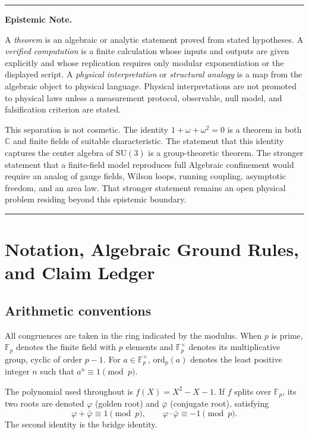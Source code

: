 \documentclass[12pt,oneside]{article}
\theoremstyle{principia}
\theoremstyle{definition}
\theoremstyle{remark}
\providecommand{\CC}{\mathbb{C}}
\providecommand{\FF}{\mathbb{F}}
\providecommand{\vp}{\varphi}
\providecommand{\vpbar}{\bar{\varphi}}
\begin{document}
\newpage

\newpage

\vspace{0.5em}
\noindent\rule{\linewidth}{0.4pt}
{\small\noindent\textbf{Epistemic Note.}

A \emph{theorem} is an algebraic or analytic statement proved from stated hypotheses. A \emph{verified computation} is a finite calculation whose inputs and outputs are given explicitly and whose replication requires only modular exponentiation or the displayed script. A \emph{physical interpretation} or \emph{structural analogy} is a map from the algebraic object to physical language. Physical interpretations are not promoted to physical laws unless a measurement protocol, observable, null model, and falsification criterion are stated.

This separation is not cosmetic. The identity $1 + \omega + \omega^2 = 0$ is a theorem in both $\CC$ and finite fields of suitable characteristic. The statement that this identity captures the center algebra of $\mathrm{SU}(3)$ is a group-theoretic theorem. The stronger statement that a finite-field model reproduces full Algebraic confinement would require an analog of gauge fields, Wilson loops, running coupling, asymptotic freedom, and an area law. That stronger statement remains an open physical problem residing beyond this epistemic boundary.}
\noindent\rule{\linewidth}{0.4pt}
\vspace{0.5em}

\section{Notation, Algebraic Ground Rules, and Claim Ledger}

\subsection{Arithmetic conventions}

All congruences are taken in the ring indicated by the modulus. When $p$ is prime, $\FF_p$ denotes the finite field with $p$ elements and $\FF_p^\times$ denotes its multiplicative group, cyclic of order $p - 1$. For $a \in \FF_p^\times$, $\mathrm{ord}_p(a)$ denotes the least positive integer $n$ such that $a^n \equiv 1 \pmod{p}$.

The polynomial used throughout is $f(X) = X^2 - X - 1$. If $f$ splits over $\FF_p$, its two roots are denoted $\vp$ (golden root) and $\vpbar$ (conjugate root), satisfying
\[
\vp + \vpbar \equiv 1 \pmod{p}, \qquad \vp \cdot \vpbar \equiv -1 \pmod{p}.
\]
The second identity is the bridge identity.
\end{document}
